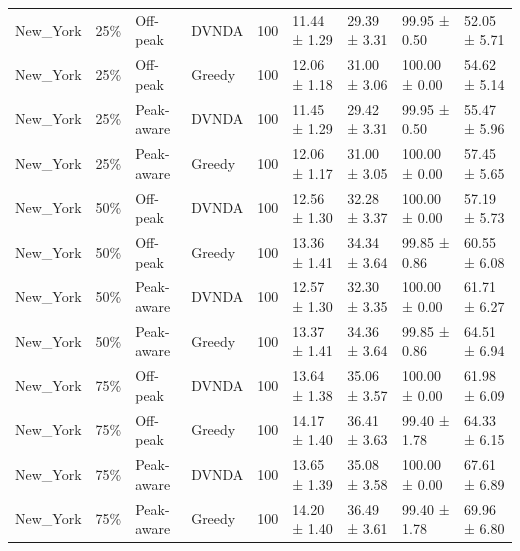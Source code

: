 \begin{tabular}{lllllllll}
New\_York & 25\% & Off-peak & DVNDA & 100 & 11.44 ± 1.29 & 29.39 ± 3.31 & 99.95 ± 0.50 & 52.05 ± 5.71 \\
New\_York & 25\% & Off-peak & Greedy & 100 & 12.06 ± 1.18 & 31.00 ± 3.06 & 100.00 ± 0.00 & 54.62 ± 5.14 \\
New\_York & 25\% & Peak-aware & DVNDA & 100 & 11.45 ± 1.29 & 29.42 ± 3.31 & 99.95 ± 0.50 & 55.47 ± 5.96 \\
New\_York & 25\% & Peak-aware & Greedy & 100 & 12.06 ± 1.17 & 31.00 ± 3.05 & 100.00 ± 0.00 & 57.45 ± 5.65 \\
New\_York & 50\% & Off-peak & DVNDA & 100 & 12.56 ± 1.30 & 32.28 ± 3.37 & 100.00 ± 0.00 & 57.19 ± 5.73 \\
New\_York & 50\% & Off-peak & Greedy & 100 & 13.36 ± 1.41 & 34.34 ± 3.64 & 99.85 ± 0.86 & 60.55 ± 6.08 \\
New\_York & 50\% & Peak-aware & DVNDA & 100 & 12.57 ± 1.30 & 32.30 ± 3.35 & 100.00 ± 0.00 & 61.71 ± 6.27 \\
New\_York & 50\% & Peak-aware & Greedy & 100 & 13.37 ± 1.41 & 34.36 ± 3.64 & 99.85 ± 0.86 & 64.51 ± 6.94 \\
New\_York & 75\% & Off-peak & DVNDA & 100 & 13.64 ± 1.38 & 35.06 ± 3.57 & 100.00 ± 0.00 & 61.98 ± 6.09 \\
New\_York & 75\% & Off-peak & Greedy & 100 & 14.17 ± 1.40 & 36.41 ± 3.63 & 99.40 ± 1.78 & 64.33 ± 6.15 \\
New\_York & 75\% & Peak-aware & DVNDA & 100 & 13.65 ± 1.39 & 35.08 ± 3.58 & 100.00 ± 0.00 & 67.61 ± 6.89 \\
New\_York & 75\% & Peak-aware & Greedy & 100 & 14.20 ± 1.40 & 36.49 ± 3.61 & 99.40 ± 1.78 & 69.96 ± 6.80 \\
\hline
\end{tabular}
